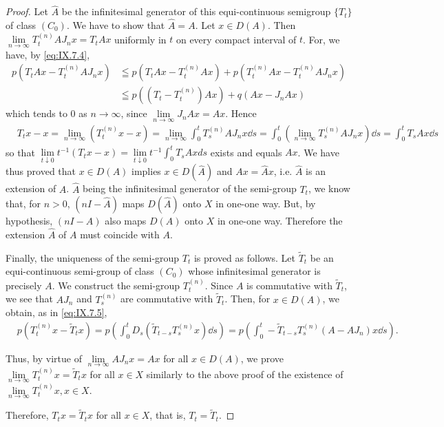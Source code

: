 \begin{proof}
Let $\hat{A}$ be the infinitesimal generator of this equi-continuous semigroup $\{T_t\}$ of class $(C_0)$. We have to show that $\hat{A} = A$. Let $x \in D(A)$. Then $\lim\limits_{n \to \infty} T_t^{(n)} A J_n x = T_t A x$ uniformly in $t$ on every compact interval of $t$. For, we have, by \eqref{eq:IX.7.4}, 
\[
\begin{aligned} p (T _{t} A x - T _{t} ^{(n)} A J _{n} x) & \leqq p (T _{t} A x - T _{t} ^{(n)} A x) + p (T _{t} ^{(n)} A x - T _{t} ^{(n)} A J _{n} x) \\ & \leqq p ((T _{t} - T _{t} ^{(n)}) A x) + q (A x - J _{n} A x) \end{aligned}
\]
which tends to $0$ as $n \to \infty$, since $\lim\limits_{n \to \infty} J_n A x = A x$. Hence 
\[
\begin{aligned}
&T _{t} x - x= \lim\limits _{n \rightarrow \infty} (T _{t} ^{(n)} x - x) = \lim\limits _{n \rightarrow \infty} \int_{0} ^{t} T _{s} ^{(n)} A J _{n} x \dd s = \int_{0} ^{t} (\lim\limits _{n \rightarrow \infty} T _{s} ^{(n)} A J _{n} x) \dd s = \int_{0} ^{t} T _{s} A x \dd s
\end{aligned}
\]
so that $\lim\limits_{t\downarrow 0}t^{-1}(T_t x - x) = \lim\limits_{t\downarrow 0}t^{-1}\int_0^t T_sAxds$ exists and equals $A x$. We 
have thus proved that $x \in D(A)$ implies $x \in D(\hat{A})$ and $Ax = \hat{A}x$, i.e. $\hat{A}$ is an extension of $A$. $\hat{A}$ being the infinitesimal generator of the semi-group $T_{t}$, we know that, for $n > 0$, $(nI - \hat{A})$ maps $D(\hat{A})$ onto $X$ in one-one way. But, by hypothesis, $(nI - A)$ also maps $D(A)$ onto $X$ in one-one way. Therefore the extension $\hat{A}$ of $A$ must coincide with $A$. 

Finally, the uniqueness of the semi-group $T_{t}$ is proved as follows. Let $\tilde{T}_{t}$ be an equi-continuous semi-group of class $(C_0)$ whose infinitesimal generator is precisely $A$. We construct the semi-group $T_{t}^{(n)}$. Since $A$ is commutative with $\tilde{T}_{t}$, we see that $AJ_{n}$ and $T_{s}^{(n)}$ are commutative with $\tilde{T}_{t}$. Then, for $x \in D(A)$, we obtain, as in \eqref{eq:IX.7.5}, 
\begin{equation}\label{eq:IX.7.6}
\begin{aligned}
&p (T _{t} ^{(n)} x - \tilde {T} _{t} x)  = p \left(\int_{0} ^{t} D _{s} (\tilde {T} _{t-s} T _{s} ^{(n)} x) \dd s\right) = p \left(\int_{0} ^{t} - \tilde {T} _{t-s} T _{s} ^{(n)} (A - A J _{n}) x \dd s\right).
\end{aligned}
\end{equation}

Thus, by virtue of $\lim\limits_{n\to \infty}AJ_nx = Ax$ for all $x\in D(A)$, we prove $\lim\limits_{n\to \infty}T_t^{(n)}x = \tilde{T}_t x$ for all $x\in X$ similarly to the above proof of the existence of $\lim\limits_{n\to \infty}T_t^{(n)}x,x\in X$. 

Therefore, $T_{t}x = \tilde{T}_{t}x$ for all $x \in X$, that is, $T_{t} = \tilde{T}_{t}$.
\end{proof}

